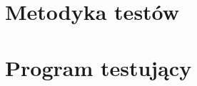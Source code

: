 \documentclass[12pt,a4paper,oneside]{report}
\begin{document}
\appendix

\chapter{Metodyka testów}



\chapter{Program testujący}






\clearpage
{}
{}
\printindex
\end{document}
